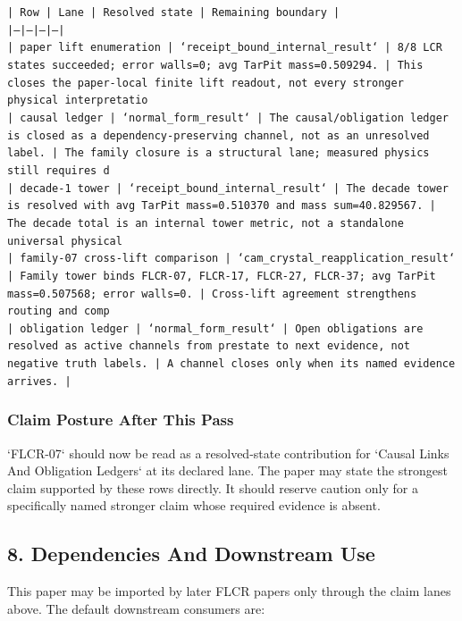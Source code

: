 \documentclass[11pt]{article}
\begin{document}
\noindent\texttt{| Row | Lane | Resolved state | Remaining boundary |}\\
\noindent\texttt{|---|---|---|---|}\\
\noindent\texttt{| paper lift enumeration | `receipt\_bound\_internal\_result` | 8/8 LCR states succeeded; error walls=0; avg TarPit mass=0.509294. | This closes the paper-local finite lift readout, not every stronger physical interpretatio}\\
\noindent\texttt{| causal ledger | `normal\_form\_result` | The causal/obligation ledger is closed as a dependency-preserving channel, not as an unresolved label. | The family closure is a structural lane; measured physics still requires d}\\
\noindent\texttt{| decade-1 tower | `receipt\_bound\_internal\_result` | The decade tower is resolved with avg TarPit mass=0.510370 and mass sum=40.829567. | The decade total is an internal tower metric, not a standalone universal physical }\\
\noindent\texttt{| family-07 cross-lift comparison | `cam\_crystal\_reapplication\_result` | Family tower binds FLCR-07, FLCR-17, FLCR-27, FLCR-37; avg TarPit mass=0.507568; error walls=0. | Cross-lift agreement strengthens routing and comp}\\
\noindent\texttt{| obligation ledger | `normal\_form\_result` | Open obligations are resolved as active channels from prestate to next evidence, not negative truth labels. | A channel closes only when its named evidence arrives. |}\\

\subsubsection*{Claim Posture After This Pass}

`FLCR-07` should now be read as a resolved-state contribution for `Causal Links And Obligation Ledgers` at its declared lane. The paper may state the strongest claim supported by these rows directly. It should reserve caution only for a specifically named stronger claim whose required evidence is absent.

\subsection*{8. Dependencies And Downstream Use}

This paper may be imported by later FLCR papers only through the claim lanes
above. The default downstream consumers are:
\end{document}
